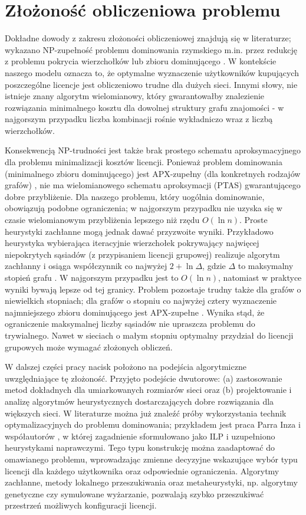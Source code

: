 \section{Złożoność obliczeniowa problemu}

Dokładne dowody z zakresu złożoności obliczeniowej znajdują się w literaturze; wykazano NP-zupełność problemu dominowania rzymskiego m.in. przez redukcję z problemu pokrycia wierzchołków lub zbioru dominującego \cite{chambers2009}. W kontekście naszego modelu oznacza to, że optymalne wyznaczenie użytkowników kupujących poszczególne licencje jest obliczeniowo trudne dla dużych sieci. Innymi słowy, nie istnieje znany algorytm wielomianowy, który gwarantowałby znalezienie rozwiązania minimalnego kosztu dla dowolnej struktury grafu znajomości - w najgorszym przypadku liczba kombinacji rośnie wykładniczo wraz z liczbą wierzchołków.

Konsekwencją NP-trudności jest także brak prostego schematu aproksymacyjnego dla problemu minimalizacji kosztów licencji. Ponieważ problem dominowania (minimalnego zbioru dominującego) jest APX-zupełny (dla konkretnych rodzajów grafów) \cite{POUREIDI2023106363}, nie ma wielomianowego schematu aproksymacji (PTAS) gwarantującego dobre przybliżenie. Dla naszego problemu, który uogólnia dominowanie, obowiązują podobne ograniczenia; w najgorszym przypadku nie uzyska się w czasie wielomianowym przybliżenia lepszego niż rzędu $O(\ln n)$. Proste heurystyki zachłanne mogą jednak dawać przyzwoite wyniki. Przykładowo heurystyka wybierająca iteracyjnie wierzchołek pokrywający najwięcej niepokrytych sąsiadów (z przypisaniem licencji grupowej) realizuje algorytm zachłanny i osiąga współczynnik co najwyżej $2+\ln \Delta$, gdzie $\Delta$ to maksymalny stopień grafu \cite{Kuhn2012NetworkAlgorithms}. W najgorszym przypadku jest to $O(\ln n)$, natomiast w praktyce wyniki bywają lepsze od tej granicy. Problem pozostaje trudny także dla grafów o niewielkich stopniach; dla grafów o stopniu co najwyżej cztery wyznaczenie najmniejszego zbioru dominującego jest APX-zupełne \cite{ALIMONTI2000123,POUREIDI2023106363}.
Wynika stąd, że ograniczenie maksymalnej liczby sąsiadów nie upraszcza problemu do trywialnego. Nawet w sieciach o małym stopniu optymalny przydział do licencji grupowych może wymagać złożonych obliczeń.

W dalszej części pracy nacisk położono na podejścia algorytmiczne uwzględniające tę złożoność. Przyjęto podejście dwutorowe: (a) zastosowanie metod dokładnych dla umiarkowanych rozmiarów sieci oraz (b) projektowanie i analizę algorytmów heurystycznych dostarczających dobre rozwiązania dla większych sieci. W literaturze można już znaleźć próby wykorzystania technik optymalizacyjnych do problemu dominowania; przykładem jest praca Parra Inza i współautorów \cite{PARRAINZA2024926}, w której zagadnienie sformułowano jako ILP i uzupełniono heurystykami naprawczymi. Tego typu konstrukcję można zaadaptować do omawianego problemu, wprowadzając zmienne decyzyjne wskazujące wybór typu licencji dla każdego użytkownika oraz odpowiednie ograniczenia. Algorytmy zachłanne, metody lokalnego przeszukiwania oraz metaheurystyki, np. algorytmy genetyczne czy symulowane wyżarzanie, pozwalają szybko przeszukiwać przestrzeń możliwych konfiguracji licencji.


